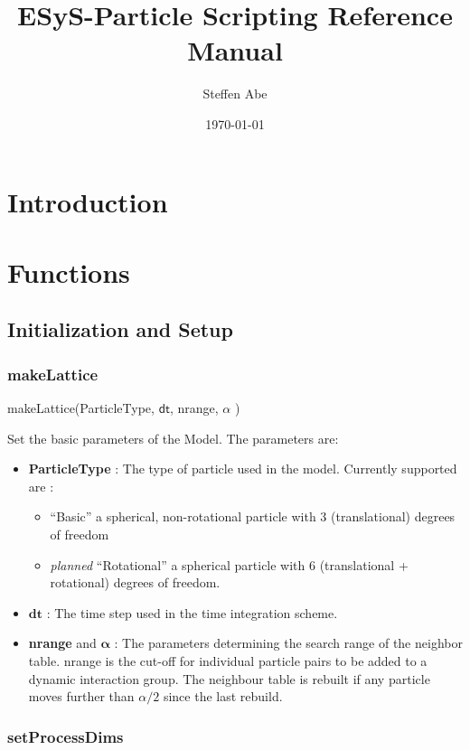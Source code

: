 \documentclass{report}
\begin{document}
\title{ESyS-Particle Scripting Reference Manual}
\author{Steffen Abe}
\date{\today}
\maketitle
\tableofcontents

\chapter{Introduction}
\chapter{Functions}

\section{Initialization and Setup}

\subsection{makeLattice}

\textsf{makeLattice(ParticleType, $\mathsf{dt}$, nrange, $\mathsf{\alpha}$ )}
\par \medskip

Set the basic parameters of the Model. The parameters are:
\begin{itemize}
\item \textbf{ParticleType} : The type of particle used in the model. Currently supported are :
\begin{itemize}
\item ``Basic'' a spherical, non-rotational particle with 3 (translational) degrees of freedom
\item \textit{planned} ``Rotational'' a spherical particle with 6 (translational + rotational) degrees of freedom. 
\end{itemize}   
\item $\mathbf{dt}$ : The time step used in the time integration scheme.
\item \textbf{nrange}  and $\mathbf{\alpha}$ : The parameters determining the search range of the neighbor table. nrange is the cut-off for individual particle pairs to be added to a dynamic interaction group. The neighbour table is rebuilt if any particle moves further than $\alpha / 2 $ since the last rebuild.
\end{itemize}
 
\subsection{setProcessDims}
\end{document}

